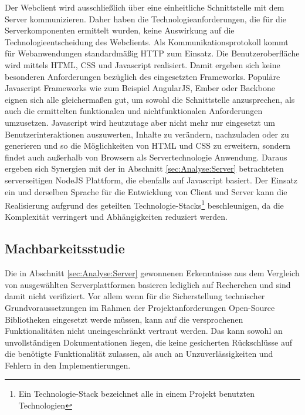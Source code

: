 Der Webclient wird ausschließlich über eine einheitliche Schnittstelle mit dem Server kommunizieren. Daher haben die Technologieanforderungen, die für die Serverkomponenten ermittelt wurden, keine Auswirkung auf die Technologieentscheidung des Webclients. Als Kommunikationsprotokoll kommt für Webanwendungen standardmäßig \ac{HTTP} zum Einsatz. Die Benutzeroberfläche wird mittels HTML, CSS und Javascript realisiert. Damit ergeben sich keine besonderen Anforderungen bezüglich des eingesetzten Frameworks. Populäre Javascript Frameworks wie zum Beispiel AngularJS, Ember oder Backbone eignen sich alle gleichermaßen gut, um sowohl die Schnittstelle anzusprechen, als auch die ermittelten funktionalen und nichtfunktionalen Anforderungen umzusetzen. Javascript wird heutzutage aber nicht mehr nur eingesetzt um Benutzerinteraktionen auszuwerten, Inhalte zu verändern, nachzuladen oder zu generieren und so die Möglichkeiten von HTML und CSS zu erweitern, sondern findet auch außerhalb von Browsern als Servertechnologie Anwendung. Daraus ergeben sich Synergien mit der in Abschnitt \ref{sec:Analyse:Server} betrachteten serverseitigen NodeJS Plattform, die ebenfalls auf Javascript basiert. Der Einsatz ein und derselben Sprache für die Entwicklung von Client und Server kann die Realisierung aufgrund des geteilten Technologie-Stacks\footnote{Ein Technologie-Stack bezeichnet alle in einem Projekt benutzten Technologien} beschleunigen, da die Komplexität verringert und Abhängigkeiten reduziert werden.

\subsection{Machbarkeitsstudie}

Die in Abschnitt \ref{sec:Analyse:Server} gewonnenen Erkenntnisse aus dem Vergleich von ausgewählten Serverplattformen basieren lediglich auf Recherchen und sind damit nicht verifiziert. Vor allem wenn für die Sicherstellung technischer Grundvoraussetzungen im Rahmen der Projektanforderungen Open-Source Bibliotheken eingesetzt werde müssen, kann auf die versprochenen Funktionalitäten nicht uneingeschränkt vertraut werden. Das kann sowohl an unvollständigen Dokumentationen liegen, die keine gesicherten Rückschlüsse auf die benötigte Funktionalität zulassen, als auch an Unzuverlässigkeiten und Fehlern in den Implementierungen.

